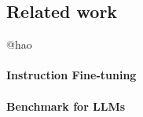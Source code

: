\subsection{Related work}
\label{sec:related-work}
@hao

\paragraph{Instruction Fine-tuning}

\paragraph{Benchmark for LLMs}
